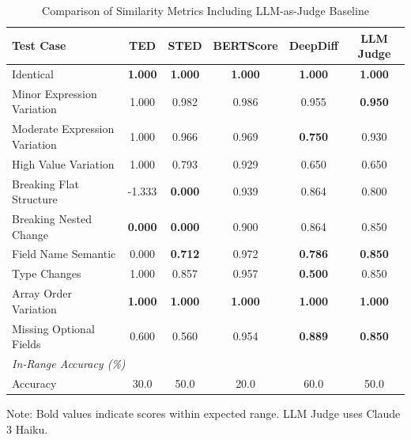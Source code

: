 
\begin{table}[h]
\centering
\caption{Comparison of Similarity Metrics Including LLM-as-Judge Baseline}
\label{tab:llm_judge_comparison}
\begin{tabular}{lccccc}
\toprule
Test Case & TED & STED & BERTScore & DeepDiff & LLM Judge \\
\midrule
Identical & \textbf{1.000} & \textbf{1.000} & \textbf{1.000} & \textbf{1.000} & \textbf{1.000} \\
Minor Expression Variation & 1.000 & 0.982 & 0.986 & 0.955 & \textbf{0.950} \\
Moderate Expression Variation & 1.000 & 0.966 & 0.969 & \textbf{0.750} & 0.930 \\
High Value Variation & 1.000 & 0.793 & 0.929 & 0.650 & 0.650 \\
Breaking Flat Structure & -1.333 & \textbf{0.000} & 0.939 & 0.864 & 0.800 \\
Breaking Nested Change & \textbf{0.000} & \textbf{0.000} & 0.900 & 0.864 & 0.850 \\
Field Name Semantic & 0.000 & \textbf{0.712} & 0.972 & \textbf{0.786} & \textbf{0.850} \\
Type Changes & 1.000 & 0.857 & 0.957 & \textbf{0.500} & 0.850 \\
Array Order Variation & \textbf{1.000} & \textbf{1.000} & \textbf{1.000} & \textbf{1.000} & \textbf{1.000} \\
Missing Optional Fields & 0.600 & 0.560 & 0.954 & \textbf{0.889} & \textbf{0.850} \\
\midrule
\multicolumn{6}{l}{\textit{In-Range Accuracy (\%)}} \\
Accuracy & 30.0 & 50.0 & 20.0 & 60.0 & 50.0 \\
\bottomrule
\end{tabular}
\begin{tablenotes}
\small
\item Note: Bold values indicate scores within expected range. LLM Judge uses Claude 3 Haiku.
\end{tablenotes}
\end{table}
